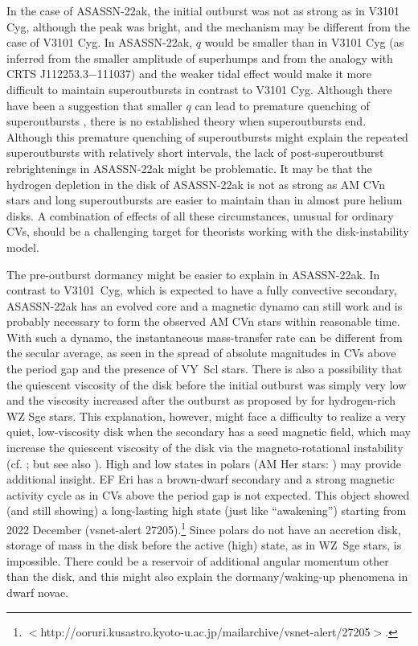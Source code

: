 \documentclass{article}
\def\cite{\citealt}
\begin{document}
   In the case of ASASSN-22ak, the initial outburst was
not as strong as in V3101 Cyg, although the peak was bright,
and the mechanism may be different from the case of
V3101 Cyg.  In ASASSN-22ak, $q$ would be smaller than in
V3101 Cyg (as inferred from the smaller amplitude of
superhumps and from the analogy with CRTS J112253.3$-$111037)
and the weaker tidal effect would make it more difficult to
maintain superoutbursts in contrast to V3101 Cyg.
Although there have been a suggestion that smaller $q$
can lead to premature quenching of superoutbursts
\citep[see e.g.,][]{hel01eruma}, there is no established
theory when superoutbursts end.  Although this premature
quenching of superoutbursts might explain the repeated
superoutbursts with relatively short intervals, the lack of
post-superoutburst rebrightenings in ASASSN-22ak might be
problematic.  It may be that the hydrogen
depletion in the disk of ASASSN-22ak is not as strong as
AM CVn stars and long superoutbursts are easier to
maintain than in almost pure helium disks.  A combination
of effects of all these circumstances, unusual for
ordinary CVs, should be a challenging target for
theorists working with the disk-instability model.

   The pre-outburst dormancy might be easier
to explain in ASASSN-22ak.  In contrast to V3101~Cyg, 
which is expected to have a fully convective secondary,
ASASSN-22ak has an evolved core and a magnetic dynamo can still work 
\citep[see e.g.,][]{sak23amcvnevol} and is probably necessary
to form the observed AM CVn stars within reasonable time.
With such a dynamo, the instantaneous mass-transfer rate can
be different from the secular average, as seen in the spread of
absolute magnitudes in CVs above the period gap \citep{deb18CVgaia}
and the presence of VY~Scl stars.
There is also a possibility that the quiescent viscosity
of the disk before the initial outburst was simply very low and
the viscosity increased after the outburst as proposed by
\citet{osa01egcnc,mey15suumareb} for hydrogen-rich WZ Sge stars.
This explanation, however, might face a difficulty
to realize a very quiet, low-viscosity disk when the secondary
has a seed magnetic field, which may increase
the quiescent viscosity of the disk via the magneto-rotational
instability (cf. \cite{mey99diskviscosity};
but see also \cite{ish01rzleo}).
High and low states in polars (AM Her stars: \cite{cro90polarreview})
may provide additional insight.
EF Eri has a brown-dwarf secondary
\citep[][and the references therein]{sch10eferi} and a strong
magnetic activity cycle as in CVs above the period gap
is not expected.  This object showed (and still showing)
a long-lasting high state (just like ``awakening'')
starting from 2022 December (vsnet-alert 27205).\footnote{
   $<$http://ooruri.kusastro.kyoto-u.ac.jp/mailarchive/vsnet-alert/27205$>$.
} Since polars do not have an accretion disk, storage of mass
in the disk before the active (high) state, as in WZ~Sge stars,
is impossible.  There could be a reservoir of additional angular
momentum other than the disk, and this might also explain
the dormany/waking-up phenomena in dwarf novae.
\end{document}
